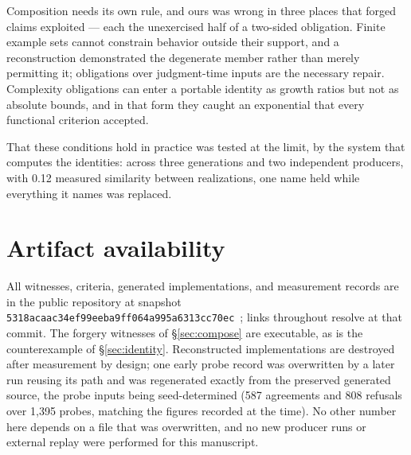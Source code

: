 \documentclass[10pt,twocolumn,letterpaper]{article}
\begin{document}
Composition needs its own rule, and ours was wrong in three places that forged claims exploited --- each the unexercised half of a two-sided obligation. Finite example sets cannot constrain behavior outside their support, and a reconstruction demonstrated the degenerate member rather than merely permitting it; obligations over judgment-time inputs are the necessary repair. Complexity obligations can enter a portable identity as growth ratios but not as absolute bounds, and in that form they caught an exponential that every functional criterion accepted.

That these conditions hold in practice was tested at the limit, by the system that computes the identities: across three generations and two independent producers, with 0.12 measured similarity between realizations, one name held while everything it names was replaced.

\balance
\section*{Artifact availability}
All witnesses, criteria, generated implementations, and measurement records are in the public repository at snapshot \texttt{5318acaac34e\-f99eeba9ff06\-4a995a6313cc70ec}~\cite{repo}; links throughout resolve at that commit. The forgery witnesses of §\ref{sec:compose} are executable, as is the counterexample of §\ref{sec:identity}. Reconstructed implementations are destroyed after measurement by design; one early probe record was overwritten by a later run reusing its path and was regenerated exactly from the preserved generated source, the probe inputs being seed-determined (587 agreements and 808 refusals over 1{,}395 probes, matching the figures recorded at the time). No other number here depends on a file that was overwritten, and no new producer runs or external replay were performed for this manuscript.
\end{document}
